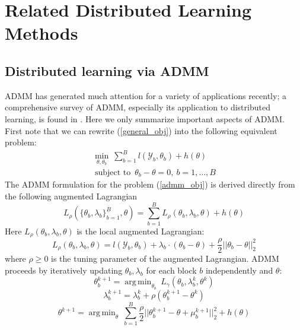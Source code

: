 \documentclass{article}
\DeclareMathOperator*{\argmin}{arg\,min}
\DeclareMathOperator*{\st}{subject~to}
\newcommand{\1}[0]{\ensuremath{\boldsymbol{1}}\xspace}
\begin{document}
\section{Related Distributed Learning Methods}

\subsection{Distributed learning via ADMM}\label{ADMM}
ADMM has generated much attention for a variety of applications recently; a comprehensive survey of ADMM, especially its application to distributed learning, is found in \cite{Boyd10}. Here we only summarize important aspects of ADMM. First note that we can rewrite (\ref{general_obj}) into the following equivalent problem:
\begin{equation}\label{admm_obj}
\begin{gathered}
\min_{\theta, \theta_b} ~ \textstyle\sum_{b=1}^Bl(\mathcal{Y}_b,\theta_b) + h(\theta)\\
\st ~ \theta_b - \theta = 0, ~ b = 1,\ldots,B
\end{gathered}
\end{equation}
The ADMM formulation for the problem (\ref{admm_obj}) is derived directly from the following augmented Lagrangian
\begin{equation}\label{admm_lag_global}
\textstyle L_\rho(\{\theta_b, \lambda_b\}_{b=1}^B, \theta) =  \sum_{b=1}^BL_\rho(\theta_b, \lambda_b, \theta) + h(\theta)
\end{equation}
Here $L_\rho(\theta_b, \lambda_b, \theta)$ is the local augmented Lagrangian:
\begin{equation}\label{admm_lag_local}
\textstyle L_\rho(\theta_b, \lambda_b, \theta)  = l(\mathcal{Y}_b, \theta_b) + \lambda_b\cdot(\theta_b - \theta) + \frac{\rho}{2}||\theta_b - \theta||_2^2
\end{equation}
where $\rho \ge 0$ is the tuning parameter of the augmented Lagrangian. ADMM proceeds by iteratively updating $\theta_b, \lambda_b$ for each block $b$ independently and $\theta$:
\begin{equation}\label{admm_update_local}
\textstyle \theta_b^{k+1} = \argmin_{\theta_b}~L_\gamma(\theta_b, \lambda_b^k, \theta^k)
\end{equation}
\begin{equation}\label{admm_update_lag}
\textstyle \lambda_b^{k+1} = \lambda_b^k + \rho(\theta_b^{k+1} - \theta^{k})
\end{equation}
\begin{equation}\label{admm_update_global}
\theta^{k+1} = \argmin_\theta ~\textstyle\sum_{b=1}^B\frac{\rho}{2}||\theta_b^{k+1} - \theta + \mu_b^{k+1}||^2_2 + h(\theta)
\end{equation}
\end{document}
